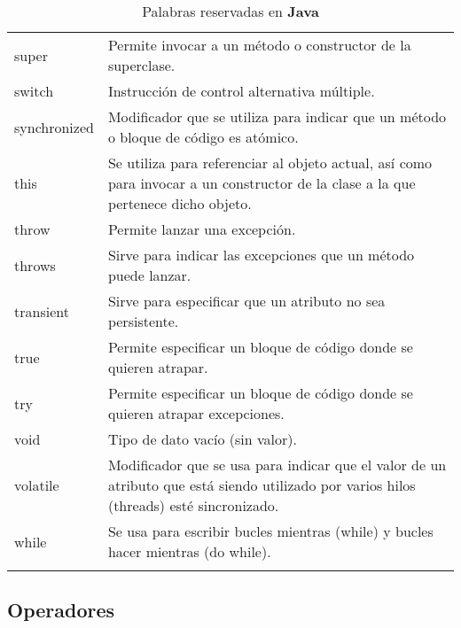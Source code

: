 \documentclass[12pt, A4]{article}
\begin{document}
{{{\begin{longtable}[h]{p{3cm} p{10cm}}
					super	& Permite invocar a un método o constructor de la superclase.\\
					\rowcolor{gray!20} switch	& Instrucción de control alternativa múltiple.\\
					synchronized	& Modificador que se utiliza para indicar que un método o bloque de código es atómico.\\
					\rowcolor{gray!20}	this	& Se utiliza para referenciar al objeto actual, así como para invocar a un constructor de la clase a la que pertenece dicho objeto.\\
					throw	& Permite lanzar una excepción.\\
					\rowcolor{gray!20}	throws	& Sirve para indicar las excepciones que un método puede lanzar.\\
					transient		& Sirve para especificar que un atributo no sea persistente.\\
					\rowcolor{gray!20}	true	&  Permite especificar un bloque de código donde se quieren atrapar.\\
					try	&  Permite especificar un bloque de código donde se quieren atrapar excepciones.\\
					\rowcolor{gray!20}	void	& Tipo de dato vacío (sin valor).\\
					volatile	& Modificador que se usa para indicar que el valor de un atributo que está siendo utilizado por varios hilos (threads) esté sincronizado.\\
						\rowcolor{gray!20} while	& Se usa para escribir bucles mientras (while) y bucles hacer mientras (do while).\\ \hline
	\caption{Palabras reservadas en \textbf{Java}}
	\end{longtable}
		}
	\vspace{-0.8 cm}
		
		\subsection{Operadores}
		{
			
}}}
\end{document}
